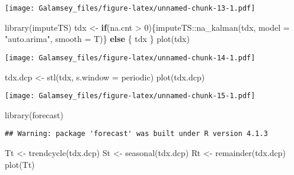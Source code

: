 \documentclass[
]{report}
\newenvironment{Shaded}{\begin{snugshade}}{\end{snugshade}}
\newcommand{\AttributeTok}[1]{\textcolor[rgb]{0.77,0.63,0.00}{#1}}
\newcommand{\ControlFlowTok}[1]{\textcolor[rgb]{0.13,0.29,0.53}{\textbf{#1}}}
\newcommand{\DecValTok}[1]{\textcolor[rgb]{0.00,0.00,0.81}{#1}}
\newcommand{\FunctionTok}[1]{\textcolor[rgb]{0.00,0.00,0.00}{#1}}
\newcommand{\NormalTok}[1]{#1}
\newcommand{\OtherTok}[1]{\textcolor[rgb]{0.56,0.35,0.01}{#1}}
\newcommand{\SpecialCharTok}[1]{\textcolor[rgb]{0.00,0.00,0.00}{#1}}
\newcommand{\StringTok}[1]{\textcolor[rgb]{0.31,0.60,0.02}{#1}}
\begin{document}
\texttt{[image: Galamsey\_files/figure-latex/unnamed-chunk-13-1.pdf]}

\begin{Shaded}
\begin{Highlighting}[]
\FunctionTok{library}\NormalTok{(imputeTS)}
\NormalTok{tdx }\OtherTok{\textless{}{-}} \ControlFlowTok{if}\NormalTok{(na.cnt }\SpecialCharTok{\textgreater{}} \DecValTok{0}\NormalTok{)\{imputeTS}\SpecialCharTok{::}\FunctionTok{na\_kalman}\NormalTok{(tdx, }\AttributeTok{model =} \StringTok{"auto.arima"}\NormalTok{, }\AttributeTok{smooth =}\NormalTok{ T)\} }\ControlFlowTok{else}\NormalTok{ \{}
\NormalTok{    tdx}
\NormalTok{\}}
\FunctionTok{plot}\NormalTok{(tdx)}
\end{Highlighting}
\end{Shaded}

\texttt{[image: Galamsey\_files/figure-latex/unnamed-chunk-14-1.pdf]}

\begin{Shaded}
\begin{Highlighting}[]
\NormalTok{tdx.dcp }\OtherTok{\textless{}{-}} \FunctionTok{stl}\NormalTok{(tdx, }\AttributeTok{s.window =} \StringTok{\textquotesingle{}periodic\textquotesingle{}}\NormalTok{)}
\FunctionTok{plot}\NormalTok{(tdx.dcp)}
\end{Highlighting}
\end{Shaded}

\texttt{[image: Galamsey\_files/figure-latex/unnamed-chunk-15-1.pdf]}

\begin{Shaded}
\begin{Highlighting}[]
\FunctionTok{library}\NormalTok{(forecast)}
\end{Highlighting}
\end{Shaded}

\begin{verbatim}
## Warning: package 'forecast' was built under R version 4.1.3
\end{verbatim}

\begin{Shaded}
\begin{Highlighting}[]
\NormalTok{Tt }\OtherTok{\textless{}{-}} \FunctionTok{trendcycle}\NormalTok{(tdx.dcp)}
\NormalTok{St }\OtherTok{\textless{}{-}} \FunctionTok{seasonal}\NormalTok{(tdx.dcp)}
\NormalTok{Rt }\OtherTok{\textless{}{-}} \FunctionTok{remainder}\NormalTok{(tdx.dcp)}
\FunctionTok{plot}\NormalTok{(Tt)}
\end{Highlighting}
\end{Shaded}
\end{document}
